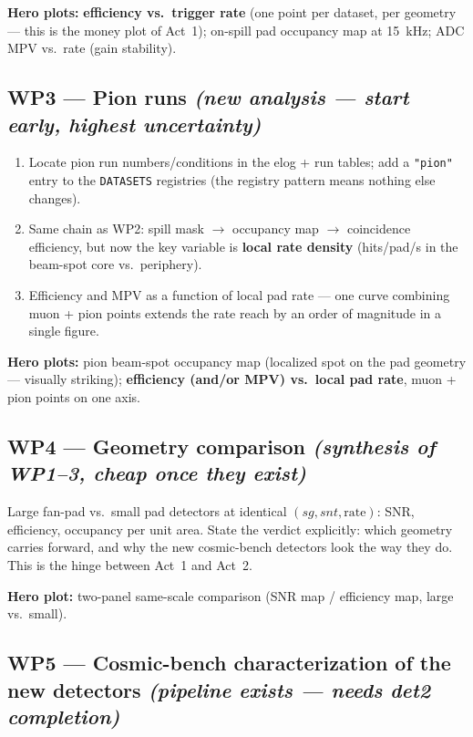 \documentclass[11pt,a4paper]{article}
\newcommand{\code}[1]{\texttt{#1}}
\begin{document}
\textbf{Hero plots:} \textbf{efficiency vs.\ trigger rate} (one point per
dataset, per geometry --- this is the money plot of Act~1); on-spill pad
occupancy map at 15~kHz; ADC MPV vs.\ rate (gain stability).

\subsection*{WP3 --- Pion runs \emph{(new analysis --- start early, highest uncertainty)}}

\begin{enumerate}[itemsep=1pt]
  \item Locate pion run numbers/conditions in the elog + run tables; add a
    \code{"pion"} entry to the \code{DATASETS} registries (the registry
    pattern means nothing else changes).
  \item Same chain as WP2: spill mask $\rightarrow$ occupancy map
    $\rightarrow$ coincidence efficiency, but now the key variable is
    \textbf{local rate density} (hits/pad/s in the beam-spot core vs.\ periphery).
  \item Efficiency and MPV as a function of local pad rate --- one curve
    combining muon + pion points extends the rate reach by an order of
    magnitude in a single figure.
\end{enumerate}

\textbf{Hero plots:} pion beam-spot occupancy map (localized spot on the pad
geometry --- visually striking); \textbf{efficiency (and/or MPV) vs.\ local pad
rate}, muon + pion points on one axis.

\subsection*{WP4 --- Geometry comparison \emph{(synthesis of WP1--3, cheap once they exist)}}

Large fan-pad vs.\ small pad detectors at identical $(sg, snt, \text{rate})$:
SNR, efficiency, occupancy per unit area. State the verdict explicitly: which
geometry carries forward, and why the new cosmic-bench detectors look the way
they do. This is the hinge between Act~1 and Act~2.

\textbf{Hero plot:} two-panel same-scale comparison (SNR map / efficiency map,
large vs.\ small).

\subsection*{WP5 --- Cosmic-bench characterization of the new detectors \emph{(pipeline exists --- needs det2 completion)}}
\end{document}
